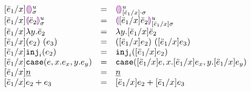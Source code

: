 \begin{figure}[h!]
\[
\begin{array}{lcl}
[\ddot{e}_1 / x] \textcolor{violet}{\llparenthesis}\textcolor{violet}{\rrparenthesis}^{u}_{\sigma}
&=&
\textcolor{violet}{\llparenthesis}\textcolor{violet}{\rrparenthesis}^{u}_{[\ddot{e}_1 / x] \cdot \sigma}
\\
{[\ddot{e}_1 / x] \textcolor{violet}{\llparenthesis}\ddot{e}_2\textcolor{violet}{\rrparenthesis}^{u}_{\sigma}}
&=& 
\textcolor{violet}{\llparenthesis} [ \ddot{e}_1 / x ] \ddot{e}_2 \textcolor{violet}{\rrparenthesis}^{u}_{[\ddot{e}_1 / x] \sigma}
\\
{[\ddot{e}_1 / x] \lambda y.\ddot{e}_2}
&=&
{\lambda y.[\ddot{e}_1 / x] \ddot{e}_2}
\\
{[\ddot{e}_1 / x] (e_2)~(e_3)}
&=&
{([\ddot{e}_1 / x] e_2)~([\ddot{e}_1 / x] e_3)}
\\
{[\ddot{e}_1 / x] \texttt{inj}_{i}({e_2})}
&=&
{\texttt{inj}_{i}({[\ddot{e}_1 / x] e_2})}
\\
{[\ddot{e}_1 / x] \texttt{case}({e},{x}.{e_x},{y}.{e_y})}
&=&
{\texttt{case}({[\ddot{e}_1 / x]e},{x}.{[\ddot{e}_1 / x]e_x},{y}.{[\ddot{e}_1 / x]e_y})}
\\
{[\ddot{e}_1 / x] \underline{n}}
&=&
{\underline{n}}
\\
{[\ddot{e}_1 / x] e_2 + e_3}
&=&
{[\ddot{e}_1 / x] e_2 + [\ddot{e}_1 / x] e_3}
\end{array}
\]
\end{figure}

